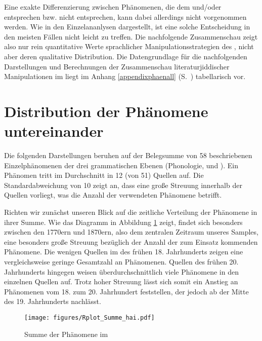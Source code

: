 Eine exakte Differenzierung zwischen Phänomenen, die dem \hai{{\WJ}} und/oder \hai{{\OJ}} entsprechen bzw. nicht entsprechen, kann dabei allerdings nicht vorgenommen werden. Wie in den Einzelananlysen dargestellt, ist eine solche Entscheidung in den meisten Fällen nicht leicht zu treffen. Die nachfolgende Zusammenschau zeigt also nur rein quantitative Werte sprachlicher Manipulationsstrategien des \hai{{\LiJi}}, nicht aber deren qualitative Distribution. Die Datengrundlage für die nachfolgenden Darstellungen und Berechnungen der Zusammenschau literaturjiddischer Manipulationen im  liegt im Anhang \ref{appendixphaenall} (S.\, \pageref{appendixphaenall}) tabellarisch vor.

 
\section{Distribution der Phänomene untereinander}\label{clusterPhänomene}
Die folgenden Darstellungen beruhen auf der Belegsumme von 58 beschriebenen Einzelphänomenen der drei grammatischen Ebenen (Phonologie,  und ). Ein Phänomen tritt im Durchschnitt in 12 (von 51) Quellen auf.  Die Standardabweichung von 10 zeigt an, dass eine große Streuung innerhalb der Quellen vorliegt, was die Anzahl der verwendeten Phänomene betrifft. 

Richten wir zunächst unseren Blick auf die zeitliche Verteilung der Phänomene in ihrer Summe. Wie das Diagramm in Abbildung \ref{boxplotjahrsumme} zeigt, findet sich besonders zwischen den 1770ern und 1870ern, also dem zentralen Zeitraum unseres Samples, eine besonders große Streuung bezüglich der Anzahl der zum Einsatz kommenden Phänomene. Die wenigen Quellen im  des frühen 18. Jahrhunderts zeigen eine vergleichsweise geringe Gesamtzahl an Phänomenen.  Quellen des frühen 20. Jahrhunderts hingegen weisen überdurchschnittlich viele Phänomene in den einzelnen Quellen auf. Trotz hoher Streuung lässt sich somit ein Anstieg an Phänomenen vom 18. zum 20. Jahrhundert feststellen, der jedoch ab der Mitte des 19. Jahrhunderts nachlässt.



\begin{figure}
\centering
\texttt{[image: figures/Rplot\_Summe\_hai.pdf]}
		\caption{\label{boxplotjahrsumme}Summe der Phänomene im }
	\end{figure}
 


